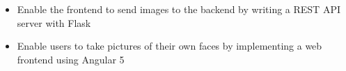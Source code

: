 
\begin{itemize}
  \item Enable the frontend to send images to the backend by writing a
  REST API server with Flask
  \item Enable users to take pictures of their own faces by implementing a
  web frontend using Angular 5
\end{itemize}
